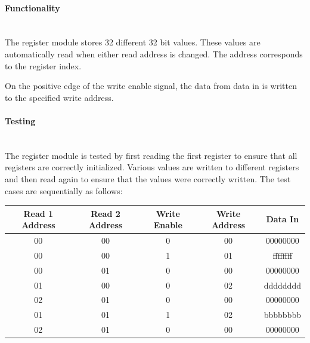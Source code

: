 \documentclass{article}
\begin{document}
    \paragraph{Functionality}
    \hfill\\

    The register module stores 32 different 32 bit values. These values are
    automatically read when either read address is changed. The address
    corresponds to the register index.

    On the positive edge of the write enable signal, the data from data in
    is written to the specified write address.

    \paragraph{Testing}
    \hfill\\

    The register module is tested by first reading the first register to
    ensure that all registers are correctly initialized. Various values
    are written to different registers and then read again to ensure that
    the values were correctly written. The test cases are sequentially as
    follows:

    \begin{center}
        \begin{tabular}{|c|c|c|c|c|}
            \hline
            Read 1 Address & Read 2 Address & Write Enable & Write Address & Data In
            \\\hline\hline
            00 & 00 & 0 & 00 & 00000000
            \\\hline
            00 & 00 & 1 & 01 & ffffffff
            \\\hline
            00 & 01 & 0 & 00 & 00000000
            \\\hline
            01 & 00 & 0 & 02 & dddddddd
            \\\hline
            02 & 01 & 0 & 00 & 00000000
            \\\hline
            01 & 01 & 1 & 02 & bbbbbbbb
            \\\hline
            02 & 01 & 0 & 00 & 00000000
            \\\hline
        \end{tabular}
    \end{center}
\end{document}
